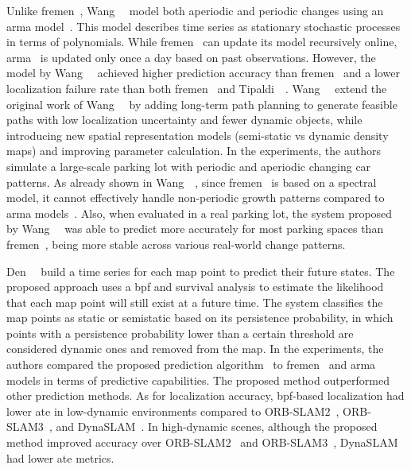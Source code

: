 Unlike \gls{fremen}~\cite{krajnik:tro:2017}, Wang~\etal~\cite{wang:iros:2020}
model both aperiodic and periodic changes using
an \gls{arma} model~\cite{hassler:inbook:2016}.
This model describes time series as stationary stochastic processes
in terms of polynomials. While \gls{fremen}~\cite{krajnik:tro:2017} can update
its model recursively online, \gls{arma}~\cite{wang:iros:2020} is updated only
once a day based on past observations.
However, the model by Wang~\etal~\cite{wang:iros:2020} achieved
higher prediction accuracy than \gls{fremen}~\cite{krajnik:tro:2017}
and a lower localization failure rate than both
\gls{fremen}~\cite{krajnik:tro:2017} and Tipaldi~\etal~\cite{tipaldi:ijrr:2013}.
Wang~\etal~\cite{wang:ras:2024} extend the original work of
Wang~\etal~\cite{wang:iros:2020} by adding long-term path planning
to generate feasible paths with low localization uncertainty
and fewer dynamic objects, while introducing new spatial representation models
(semi-static vs dynamic density maps) and improving parameter calculation.
In the experiments, the authors simulate a large-scale parking lot
with periodic and aperiodic changing car patterns.
As already shown in Wang~\etal~\cite{wang:iros:2020},
since \gls{fremen}~\cite{krajnik:tro:2017} is based on a spectral model,
it cannot effectively handle non-periodic growth patterns compared to \gls{arma}
models~\cite{wang:iros:2020,wang:ras:2024}.
Also, when evaluated in a real parking lot,
the system proposed by Wang~\etal~\cite{wang:ras:2024} was able
to predict more accurately for most parking spaces than
\gls{fremen}~\cite{krajnik:tro:2017},
being more stable across various real-world change patterns.

Den~\etal~\cite{deng:ram:2023} build a time series for each map point
to predict their future states. The proposed approach uses a \gls{bpf}
and survival analysis to estimate the likelihood that each map point
will still exist at a future time.
The system classifies the map points as static or semistatic
based on its persistence probability,
in which points with a persistence probability lower than a certain threshold
are considered dynamic ones and removed from the map.
In the experiments, the authors compared the proposed prediction
algorithm~\cite{deng:ram:2023} to \gls{fremen}~\cite{krajnik:tro:2017} and
\gls{arma}~\cite{hassler:inbook:2016} models in terms of predictive capabilities.
The proposed method outperformed other prediction methods.
As for localization accuracy, \gls{bpf}-based localization had lower \gls{ate}
in low-dynamic environments compared to
ORB-SLAM2~\cite{mur-artal-tardos:tro:2017},
ORB-SLAM3~\cite{campos:tro:2021}, and DynaSLAM~\cite{bescos:ral:2018}.
In high-dynamic scenes, although the proposed method improved accuracy over
ORB-SLAM2~\cite{mur-artal-tardos:tro:2017} and ORB-SLAM3~\cite{campos:tro:2021},
DynaSLAM~\cite{bescos:ral:2018} had lower \gls{ate} metrics.

